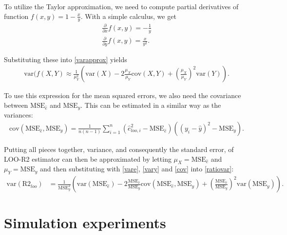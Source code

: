 \documentclass{article}
\begin{document}
To utilize the Taylor approximation, we need to compute partial derivatives of function $f(x,y) = 1 - \frac{x}{y}$. With a simple calculus, we get
\begin{align}
    \frac{\partial}{\partial x}f(x,y) = -\frac{1}{y} \\
    \frac{\partial}{\partial y}f(x,y) = \frac{x}{y^2}.
\end{align}

Substituting these into \eqref{varapprox} yields
\begin{align}
    \text{var}(f(X, Y) \approx \frac{1}{\mu_Y^2} \left( \text{var}(X) - 2 \frac{\mu_X}{\mu_Y} \text{cov}(X,Y) + \left( \frac{\mu_X}{\mu_Y} \right)^2 \text{var}(Y) \right) \label{ratiovar}.
\end{align}

 To use this expression for the mean squared errors, we also need the covariance between $\text{MSE}_{\hat{e}}$ and $\text{MSE}_y$. This can be estimated in a similar way as the variances:
 \begin{align}
     \text{cov}(\text{MSE}_{\hat{e}}, \text{MSE}_{y} ) = \frac{1}{n (n -1 )} \sum_{i = 1}^n \left( \hat{e}_{loo, i}^2 - \text{MSE}_{\hat{e}} \right) \left( (y_i - \hat{y})^2 -\text{MSE}_y \right) \label{cov}.
 \end{align}
 
 Putting all pieces together, variance, and consequently the standard error, of LOO-R2 estimator can then be approximated by letting $\mu_X = \text{MSE}_{\hat{e}}$ and $\mu_Y = \text{MSE}_y$ and then substituting with \eqref{vare}, \eqref{vary} and \eqref{cov} into \eqref{ratiovar}:
 \begin{align}
     \text{var}(\text{R2}_{loo}) &= \frac{1}{\text{MSE}_y^2} \left( \text{var}(\text{MSE}_{\hat{e}}) - 2 \frac{\text{MSE}_{\hat{e}}}{\text{MSE}_y} \text{cov}(\text{MSE}_{\hat{e}}, \text{MSE}_{y} ) +  \left( \frac{\text{MSE}_{\hat{e}}}{\text{MSE}_y} \right)^2 \text{var}(\text{MSE}_y) \right) \label{estimator}.
 \end{align}
 
\section{Simulation experiments}
\end{document}
